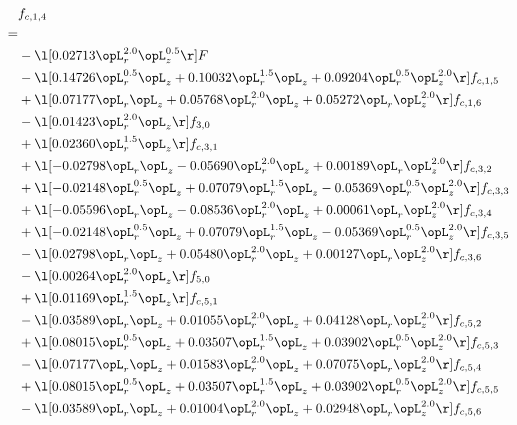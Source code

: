 \begin{alignat}{2} 
\label{eq:f_14_2} 
& f_{c,1,4} \nonumber \\ 
 = \\ 
& - \l[  0.02713 \opL_r^{2.0} \opL_z^{0.5}  \r] F \nonumber \\ 
& - \l[  0.14726 \opL_r^{0.5} \opL_z +  0.10032 \opL_r^{1.5} \opL_z +  0.09204 \opL_r^{0.5} \opL_z^{2.0}  \r] f_{c,1,5} \nonumber \\ 
& + \l[  0.07177 \opL_r \opL_z +  0.05768 \opL_r^{2.0} \opL_z +  0.05272 \opL_r \opL_z^{2.0}  \r] f_{c,1,6} \nonumber \\ 
& - \l[  0.01423 \opL_r^{2.0} \opL_z  \r] f_{3,0} \nonumber \\ 
& + \l[  0.02360 \opL_r^{1.5} \opL_z  \r] f_{c,3,1} \nonumber \\ 
& + \l[  -0.02798 \opL_r \opL_z   -0.05690 \opL_r^{2.0} \opL_z +  0.00189 \opL_r \opL_z^{2.0}  \r] f_{c,3,2} \nonumber \\ 
& + \l[  -0.02148 \opL_r^{0.5} \opL_z +  0.07079 \opL_r^{1.5} \opL_z   -0.05369 \opL_r^{0.5} \opL_z^{2.0}  \r] f_{c,3,3} \nonumber \\ 
& + \l[  -0.05596 \opL_r \opL_z   -0.08536 \opL_r^{2.0} \opL_z +  0.00061 \opL_r \opL_z^{2.0}  \r] f_{c,3,4} \nonumber \\ 
& + \l[  -0.02148 \opL_r^{0.5} \opL_z +  0.07079 \opL_r^{1.5} \opL_z   -0.05369 \opL_r^{0.5} \opL_z^{2.0}  \r] f_{c,3,5} \nonumber \\ 
& - \l[  0.02798 \opL_r \opL_z +  0.05480 \opL_r^{2.0} \opL_z +  0.00127 \opL_r \opL_z^{2.0}  \r] f_{c,3,6} \nonumber \\ 
& - \l[  0.00264 \opL_r^{2.0} \opL_z  \r] f_{5,0} \nonumber \\ 
& + \l[  0.01169 \opL_r^{1.5} \opL_z  \r] f_{c,5,1} \nonumber \\ 
& - \l[  0.03589 \opL_r \opL_z +  0.01055 \opL_r^{2.0} \opL_z +  0.04128 \opL_r \opL_z^{2.0}  \r] f_{c,5,2} \nonumber \\ 
& + \l[  0.08015 \opL_r^{0.5} \opL_z +  0.03507 \opL_r^{1.5} \opL_z +  0.03902 \opL_r^{0.5} \opL_z^{2.0}  \r] f_{c,5,3} \nonumber \\ 
& - \l[  0.07177 \opL_r \opL_z +  0.01583 \opL_r^{2.0} \opL_z +  0.07075 \opL_r \opL_z^{2.0}  \r] f_{c,5,4} \nonumber \\ 
& + \l[  0.08015 \opL_r^{0.5} \opL_z +  0.03507 \opL_r^{1.5} \opL_z +  0.03902 \opL_r^{0.5} \opL_z^{2.0}  \r] f_{c,5,5} \nonumber \\ 
& - \l[  0.03589 \opL_r \opL_z +  0.01004 \opL_r^{2.0} \opL_z +  0.02948 \opL_r \opL_z^{2.0}  \r] f_{c,5,6} \nonumber \\ 

\end{alignat}
